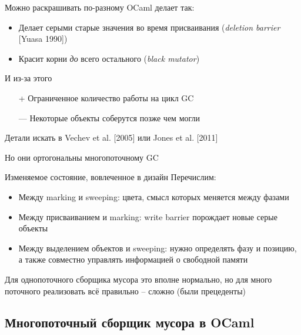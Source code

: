 \documentclass[aspectratio=169
  , xcolor={svgnames} 
  , hyperref={ colorlinks,citecolor=DeepPink4
             , linkcolor=DarkRed,urlcolor=DarkBlue}
  , russian
  ]{beamer}
\theoremstyle{exerciseStyle1}
\begin{document}
\begin{frame}{Можно раскрашивать по-разному}
OCaml делает так:
\begin{itemize}
\item Делает серыми старые значения во время присваивания (\textit{deletion barrier} [Yuasa 1990])
\item Красит корни \emph{до} всего остального (\textit{black mutator})
\end{itemize}
И из-за этого
\begin{itemize}
\item[+] Ограниченное количество работы на цикл GC
\item [---] Некоторые объекты соберутся позже чем могли
\end{itemize}
\vspace{.5cm}

Детали искать в Vechev et al. [2005] или Jones et al. [2011] \vspace{.5cm}

Но они ортогональны многопоточному GC

\end{frame}

\begin{frame}{Изменяемое состояние, вовлеченное в дизайн}
Перечислим:
\begin{itemize}
  \item Между marking и sweeping: цвета, смысл которых меняется между фазами%
  \item Между присваиванием и marking: write barrier порождает новые серые объекты %
  \item Между выделением объектов и sweeping: нужно определять фазу и  позицию, а также совместно управлять информацией о свободной памяти
\end{itemize}
\vspace{1cm}
Для однопоточного сборщика мусора это вполне нормально, но для много поточного реализовать всё правильно -- сложно (были прецеденты)
\end{frame}

\subsection{Многопоточный сборщик мусора в OCaml} 
\end{document}

